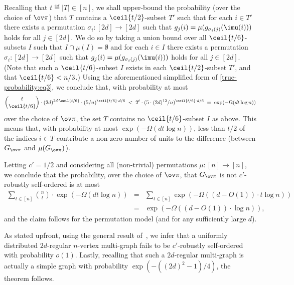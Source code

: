 Recalling that $t\eqdef|T|\in[n]$,
we shall upper-bound the probability (over the choice of $\ov\pi$)
that $T$ contains a $\ceil{t/2}$-subset $T'$
such that for each $i\in T'$ there exists
a permutation $\sigma_i:[2d]\to[2d]$
such that $g_j(i)=\mu(g_{\sigma_i(j)}(\imu(i)))$
holds for all $j\in[2d]$.
We do so by taking a union bound over all $\ceil{t/6}$-subsets $I$
such that $I\cap\mu(I)=\emptyset$
and for each $i\in I$ there exists a permutation $\sigma_i:[2d]\to[2d]$
such that $g_j(i)=\mu(g_{\sigma_i(j)}(\imu(i)))$ holds for all $j\in[2d]$.
(Note that such a $\ceil{t/6}$-subset $I$ exists
in each $\ceil{t/2}$-subset $T'$, and that $\ceil{t/6}<n/3$.)
%
%
Using the aforementioned simplified form of \eqref{true-probability:eq3},
we conclude that, with probability at most
%
$$\binom{t}{\ceil{t/6}}
   \cdot(2d)^{2d\cdot\ceil{t/6}}\cdot(5/n)^{\ceil{t/6}\cdot{d/6}}
   \;<\; 2^t\cdot(5\cdot(2d)^{12}/n)^{\ceil{t/6}\cdot d/6}
   \;=\; \exp(-\Omega(dt\log n))$$
over the choice of $\ov\pi$,
the set $T$ contains no $\ceil{t/6}$-subset $I$ as above.
This means that, with probability at most $\exp(-\Omega(d t\log n))$,
less than ${t/2}$ of the indices $i\in T$ contribute
a non-zero number of units to the difference
(between $G_{\ov \pi}$ and $\mu(G_{\ov \pi})$).


Letting $c'=1/2$ and
considering all (non-trivial) permutations $\mu:[n]\to[n]$,
we conclude that the probability, over the choice of $\ov\pi$,
that $G_{\ov\pi}$ is not $c'$-robustly self-ordered is at most
\begin{eqnarray*}
\sum_{t\in[n]}\binom{n}{t}\cdot\exp(-\Omega(d t\log n))
&=& \sum_{t\in[n]}\exp(-\Omega((d-O(1))\cdot t\log n)) \\
&=& \exp(-\Omega((d-O(1))\cdot \log n)),
\end{eqnarray*}
and the claim follows for the permutation model
(and for any sufficiently large $d$).
%

As stated upfront,
using the general result of~\cite[Thm.~1.3]{GJKW},
%
%
%
%
we infer that a uniformly distributed $2d$-regular $n$-vertex
multi-graph fails to be $c'$-robustly self-ordered with probability $o(1)$.
Lastly, recalling that such a $2d$-regular multi-graph is actually
a simple graph with probability $\exp(-((2d)^2-1)/4)$,
the theorem follows.
%
\EPF

